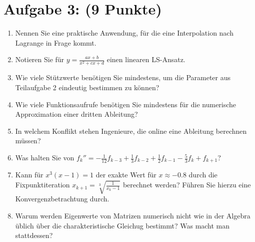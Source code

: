 \documentclass[12pt]{article}
\begin{document}
\pagebreak

\section*{Aufgabe 3: (9 Punkte)}

\begin{enumerate}

	\item Nennen Sie eine praktische Anwendung, für die eine Interpolation nach Lagrange in Frage kommt.
	
	\vspace{1cm}
	
	
	\item Notieren Sie für $y = \frac{ax + b}{x^2 + cx + d}$ einen linearen LS-Ansatz.
	
	\vspace{1cm}
	
	\item Wie viele Stützwerte benötigen Sie mindestens, um die Parameter aus Teilaufgabe 2 eindeutig bestimmen zu können?
	
	\vspace{2cm}
	
	
	\item Wie viele Funktionsaufrufe benötigen Sie mindestens für die numerische Approximation einer dritten Ableitung?
	
	\vspace{1.5cm}
	
	\item In welchem Konflikt stehen Ingenieure, die online eine Ableitung berechnen müssen?
	
	\vspace{1.5cm}
	
	\item Was halten Sie von $f_k'' = -\frac{1}{12}f_{k-3}+ \frac{1}{3}f_{k-2} + \frac{1}{2}f_{k-1} - \frac{5}{3}f_k + f_{k+1}$?
	
	\vspace{1.5cm}
	
	\item Kann für $x^3(x-1) = 1$ der exakte Wert für $x\approx -0.8$ durch die Fixpunktiteration $x_{k+1} = \sqrt[3]{\frac{1}{x_k - 1}}$ berechnet werden? Führen Sie hierzu eine Konvergenzbetrachtung durch.
	
	\vspace{3cm}
	

	\item Warum werden Eigenwerte von Matrizen numerisch nicht wie in der Algebra üblich über die charakteristische Gleichug bestimmt? Was macht man stattdessen?


\end{enumerate}
\end{document}
